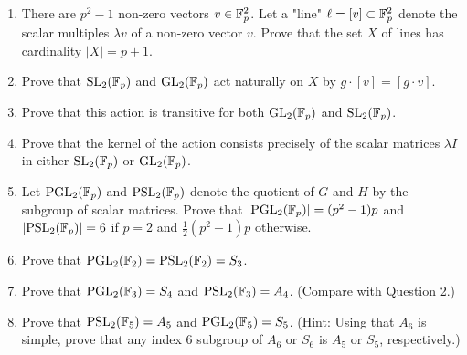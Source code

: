 \documentclass[../psets.tex]{subfiles}
\begin{document}
\begin{enumerate}
    \begin{enumerate}
        \item There are $p^2-1$ non-zero vectors $v\in\mathbb{F}_p^2$. Let a "line" $\ell=[v]\subset\mathbb{F}_p^2$ denote the scalar multiples $\lambda v$ of a non-zero vector $v$. Prove that the set $X$ of lines has cardinality $|X|=p+1$.
        \item Prove that $\text{SL}_2(\mathbb{F}_p)$ and $\text{GL}_2(\mathbb{F}_p)$ act naturally on $X$ by $g\cdot[v]=[g\cdot v]$.
        \item Prove that this action is transitive for both $\text{GL}_2(\mathbb{F}_p)$ and $\text{SL}_2(\mathbb{F}_p)$.
        \item Prove that the kernel of the action consists precisely of the scalar matrices $\lambda I$ in either $\text{SL}_2(\mathbb{F}_p)$ or $\text{GL}_2(\mathbb{F}_p)$.
        \item Let $\text{PGL}_2(\mathbb{F}_p)$ and $\text{PSL}_2(\mathbb{F}_p)$ denote the quotient of $G$ and $H$ by the subgroup of scalar matrices. Prove that $|\text{PGL}_2(\mathbb{F}_p)|=(p^2-1)p$ and $|\text{PSL}_2(\mathbb{F}_p)|=6$ if $p=2$ and $\frac{1}{2}(p^2-1)p$ otherwise.
        \item Prove that $\text{PGL}_2(\mathbb{F}_2)=\text{PSL}_2(\mathbb{F}_2)=S_3$.
        \item Prove that $\text{PGL}_2(\mathbb{F}_3)=S_4$ and $\text{PSL}_2(\mathbb{F}_3)=A_4$. (Compare with Question 2.)
        \item Prove that $\text{PSL}_2(\mathbb{F}_5)=A_5$ and $\text{PGL}_2(\mathbb{F}_5)=S_5$. (Hint: Using that $A_6$ is simple, prove that any index 6 subgroup of $A_6$ or $S_6$ is $A_5$ or $S_5$, respectively.)
    \end{enumerate}
\end{enumerate}
\end{document}
